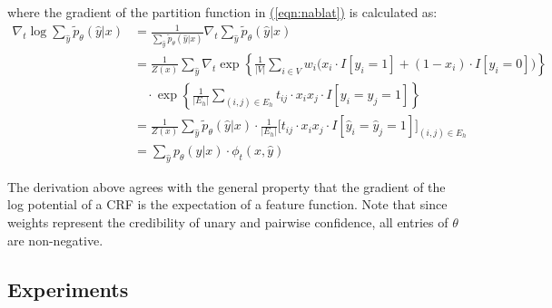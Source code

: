 \documentclass[11pt,a4paper]{article}
\begin{document}
where the gradient of the partition function in \hyperref[eqn:nablat]{(\ref{eqn:nablat})} is calculated as:
\begin{align}
\nabla_t\log\sum_{\hat{y}}\tilde{p}_\theta(\hat{y}|x)&=\frac{1}{\sum_{\hat{y}}\tilde{p}_\theta(\hat{y}|x)}\nabla_t\sum_{\hat{y}}\tilde{p}_\theta(\hat{y}|x)\nonumber\\
&=\frac{1}{Z(x)}\sum_{\hat{y}}\nabla_t\exp\left\{\frac{1}{|V|}\sum_{i\in V}w_i\big(x_i\cdot I[y_i=1]+(1-x_i)\cdot I[y_i=0]\big)\right\}\nonumber\\
&\quad\cdot\exp\left\{\frac{1}{|E_h|}\sum_{(i,j)\in E_h}t_{ij}\cdot x_ix_j\cdot I[y_i=y_j=1]\right\}\nonumber\\
&=\frac{1}{Z(x)}\sum_{\hat{y}}\tilde{p}_\theta(\hat{y}|x)\cdot\frac{1}{|E_h|}\Big[t_{ij}\cdot x_ix_j\cdot I[\hat{y}_i=\hat{y}_j=1]\Big]_{(i,j)\in E_h}\nonumber\\
&=\sum_{\hat{y}}p_\theta(\hat{y}|x)\cdot\phi_t(x,\hat{y})
\end{align}

The derivation above agrees with the general property that the gradient of the log potential of a CRF is the expectation of a feature function. Note that since weights represent the credibility of unary and pairwise confidence, all entries of $\theta$ are non-negative.

\subsection{Experiments}
\label{sec:exp2}
\end{document}
